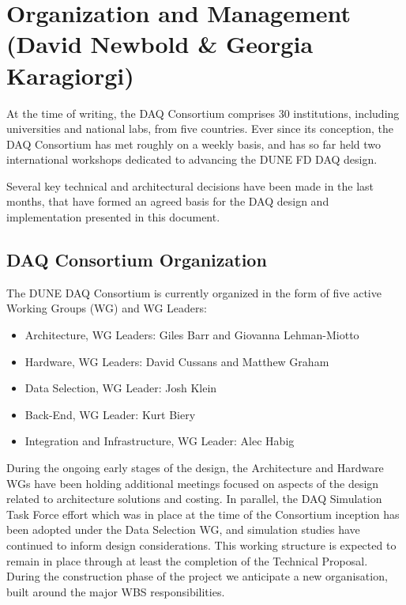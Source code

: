 
\section{Organization and Management (David Newbold \& Georgia Karagiorgi)}
\label{sec:fd-daq-org}

At the time of writing, the DAQ Consortium comprises 30 institutions, including universities and national labs, from five countries. Ever since its conception, the DAQ Consortium has met roughly on a weekly basis, and has so far held two international workshops dedicated to advancing the DUNE FD DAQ design.

Several key technical and architectural decisions have been made in the last months, that have formed an agreed basis for the DAQ design and implementation presented in this document.

\subsection{DAQ Consortium Organization}
\label{sec:fd-daq-org-consortium}

The DUNE DAQ Consortium is currently organized in the form of five active
Working Groups (WG) and WG Leaders:
\begin{itemize}
\item Architecture, WG Leaders: Giles Barr and Giovanna Lehman-Miotto 
\item Hardware, WG Leaders: David Cussans and Matthew Graham
\item Data Selection, WG Leader: Josh Klein
\item Back-End, WG Leader: Kurt Biery
\item Integration and Infrastructure, WG Leader: Alec Habig
\end{itemize}

During the ongoing early stages of the design, the Architecture and Hardware WGs have been holding additional meetings focused on aspects of the design related to architecture solutions and costing. In parallel, the DAQ Simulation Task Force effort which was in place at the time of the Consortium inception has been adopted under the Data Selection WG, and simulation studies have continued to inform design considerations. This working structure is expected to remain in place through at least the completion of the Technical Proposal. During the construction phase of the project we anticipate a new organisation, built around the major WBS responsibilities.

